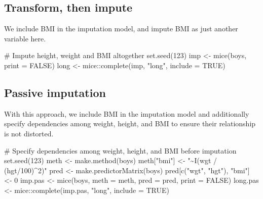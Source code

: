\documentclass[
]{article}
\newenvironment{Shaded}{}{}
\newcommand{\AttributeTok}[1]{\textcolor[rgb]{0.84,0.23,0.29}{#1}}
\newcommand{\CommentTok}[1]{\textcolor[rgb]{0.42,0.45,0.49}{#1}}
\newcommand{\ConstantTok}[1]{\textcolor[rgb]{0.00,0.36,0.77}{#1}}
\newcommand{\DecValTok}[1]{\textcolor[rgb]{0.00,0.36,0.77}{#1}}
\newcommand{\FunctionTok}[1]{\textcolor[rgb]{0.44,0.26,0.76}{#1}}
\newcommand{\NormalTok}[1]{\textcolor[rgb]{0.14,0.16,0.18}{#1}}
\newcommand{\OtherTok}[1]{\textcolor[rgb]{0.44,0.26,0.76}{#1}}
\newcommand{\SpecialCharTok}[1]{\textcolor[rgb]{0.00,0.36,0.77}{#1}}
\newcommand{\StringTok}[1]{\textcolor[rgb]{0.01,0.18,0.38}{#1}}
\begin{document}
\subsection{Transform, then impute}\label{transform-then-impute}

We include BMI in the imputation model, and impute BMI as just another
variable here.

\begin{Shaded}
\begin{Highlighting}[]
\CommentTok{\# Impute height, weight and BMI altogether}
\FunctionTok{set.seed}\NormalTok{(}\DecValTok{123}\NormalTok{)}
\NormalTok{imp }\OtherTok{\textless{}{-}} \FunctionTok{mice}\NormalTok{(boys, }\AttributeTok{print =} \ConstantTok{FALSE}\NormalTok{)}
\NormalTok{long }\OtherTok{\textless{}{-}}\NormalTok{ mice}\SpecialCharTok{::}\FunctionTok{complete}\NormalTok{(imp, }\StringTok{"long"}\NormalTok{, }\AttributeTok{include =} \ConstantTok{TRUE}\NormalTok{) }
\end{Highlighting}
\end{Shaded}

\subsection{Passive imputation}\label{passive-imputation}

With this approach, we include BMI in the imputation model and
additionally specify dependencies among weight, height, and BMI to
ensure their relationship is not distorted.

\begin{Shaded}
\begin{Highlighting}[]
\CommentTok{\# Specify dependencies among weight, height, and BMI before imputation}
\FunctionTok{set.seed}\NormalTok{(}\DecValTok{123}\NormalTok{)}
\NormalTok{meth }\OtherTok{\textless{}{-}} \FunctionTok{make.method}\NormalTok{(boys)}
\NormalTok{meth[}\StringTok{"bmi"}\NormalTok{] }\OtherTok{\textless{}{-}} \StringTok{"\textasciitilde{}I(wgt / (hgt/100)\^{}2)"}
\NormalTok{pred }\OtherTok{\textless{}{-}} \FunctionTok{make.predictorMatrix}\NormalTok{(boys)}
\NormalTok{pred[}\FunctionTok{c}\NormalTok{(}\StringTok{"wgt"}\NormalTok{, }\StringTok{"hgt"}\NormalTok{), }\StringTok{"bmi"}\NormalTok{] }\OtherTok{\textless{}{-}} \DecValTok{0}
\NormalTok{imp.pas }\OtherTok{\textless{}{-}} \FunctionTok{mice}\NormalTok{(boys, }\AttributeTok{meth =}\NormalTok{ meth, }\AttributeTok{pred =}\NormalTok{ pred,}
                \AttributeTok{print =} \ConstantTok{FALSE}\NormalTok{)}
\NormalTok{long.pas }\OtherTok{\textless{}{-}}\NormalTok{ mice}\SpecialCharTok{::}\FunctionTok{complete}\NormalTok{(imp.pas, }\StringTok{"long"}\NormalTok{, }\AttributeTok{include =} \ConstantTok{TRUE}\NormalTok{)}
\end{Highlighting}
\end{Shaded}
\end{document}
